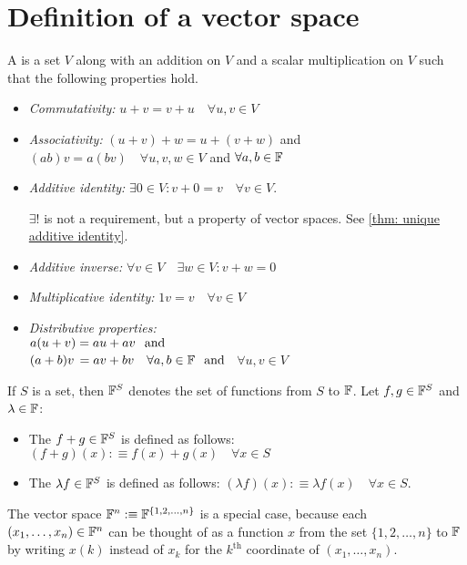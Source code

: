 \section{Definition of a vector space}

\setcounter{thm}{19}
\begin{mydef} 
  A  is a set $V$ along with an addition on $V$ and a scalar multiplication on $V$ such that the following properties hold. 
  \begin{itemize}
    \item \emph{Commutativity:}
    $ u+v = v+u \quad \forall u,v \in V$
    \item \emph{Associativity:}
    $(u+v)+w=u+(v+w)$ and $(ab)v=a(bv) \quad \forall u,v,w \in V$ and $\forall a,b \in \mathbb{F}$
    \item \emph{Additive identity:}
    $\exists 0\in V:v+0=v \quad \forall v\in V$. 
    
    $\exists!$ is not a requirement, but a property of vector spaces. See \ref{thm: unique additive identity}.
    \item \emph{Additive inverse:}
    $\forall v\in V \quad \exists w\in V: v+w=0$
    \item \emph{Multiplicative identity:}
    $1v = v \quad \forall v\in V$
    \item \emph{Distributive properties:}\\
    $a(u+v) = au+av \;\;\, \text{and}\;\;$  \\
    $(a+b)v \, = av + bv \quad \forall a,b \in \mathbb{F} \;\;\, \text{and}\;\;$
    $\forall u,v \in V$
  \end{itemize}
\end{mydef}

\setcounter{thm}{23}
\begin{mydef} 
  If $S$ is a set, then $\mathbb{F}^S$ denotes the set of functions from $S$ to $\mathbb{F}$. Let $f, g \in \mathbb{F}^{S}$ and $\lambda \in \mathbb{F}$:
  \begin{itemize}
    \item The  $f+g \in \mathbb{F}^{S}$ is defined as follows: $(f+g)(x) :\equiv f(x)+ g(x) \quad \forall x\in S$
    \item The  $\lambda f \in \mathbb{F}^{S}$ is defined as follows: $(\lambda f)(x) :\equiv \lambda f(x) \quad \forall x \in S$.
  \end{itemize}
  The vector space $\mathbb{F}^{n} :\equiv \mathbb{F}^{\{1,2,\dots,n\}}$ is a special case, because each $(x_1, \dots, x_n) \in \mathbb{F}^{n}$ can be thought of as a function $x$ from the set $\{1, 2, \dots, n\}$ to $\mathbb{F}$ by writing $x(k)$ instead of $x_k$ for the $k^{\text{th}}$ coordinate of $(x_1, \dots, x_n)$.
\end{mydef}

